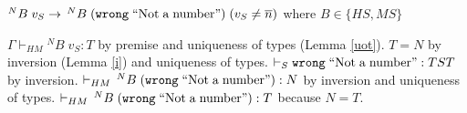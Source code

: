 \begin{case}
$^{N}B\;v_{S}\rightarrow\,^{N}B\;(\mathtt{wrong}\;\mathrm{``Not\;a\;number"})\;(v_{S}\neq\overline{n})$ where $B\in\lbrace HS,MS\rbrace$

$\Gamma\vdash_{HM}{^{N}B}\;v_{S}:T$ by premise and uniqueness of types (Lemma \ref{uot}).  $T=N$ by inversion (Lemma \ref{i}) and uniqueness of types.  $\vdash_{S}\mathtt{wrong}\;\mathrm{``Not\;a\;number"}:TST$ by inversion.  $\vdash_{HM}\,^{N}B\;(\mathtt{wrong}\;\mathrm{``Not\;a\;number"}):N$ by inversion and uniqueness of types.  $\vdash_{HM}\,^{N}B\;(\mathtt{wrong}\;\mathrm{``Not\;a\;number"}):T$ because $N=T$.
\end{case}